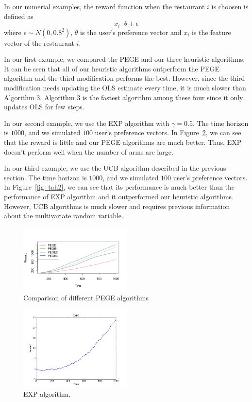 \documentclass{article}
\theoremstyle{plain}
\theoremstyle{definition}
\begin{document}
In our numerial examples, the reward function when the restaurant
$i$ is choosen is defined as 
\[
x_{i}\cdot\theta+\epsilon
\]
where $\epsilon\sim N\left(0,0.8^{2}\right)$, $\theta$ is the user's
preference vector and $x_{i}$ is the feature vector of the restaurant
$i$.

In our first example, we compared the PEGE and our three heuristic algorithms. It can be seen that all of our heuristic algorithms outperform the PEGE algorithm and the third modification performs the best. However, since the third modification needs updating the OLS estimate every time, it is much slower than Algorithm 3. Algorithm 3 is the fastest algorithm among these four since it only updates OLS for few steps.


In our second example, we use the EXP algorithm with $\gamma=0.5$.
The time horizon is $1000$, and we simulated $100$ user's preference
vectors. In Figure~\ref{fig: tahi}, we can see that the reward is little and our PEGE algorithms are much better. Thus, EXP doesn't perform well when the number of arms are large.

In our third example, we use the UCB algorithm described in the previous
section. The time horizon is $1000$, and we simulated $100$ user's
preference vectors.  In Figure~\ref{fig: tah2}, we can see that its performance is much better than the performance of EXP algorithm and it outperformed our heuristic algorithms. However, UCB algorithms is much slower and requires previous information about the multivariate random variable.

\begin{figure}[htb]
{
\centering
\includegraphics[width=0.50\textwidth,]{algo_compare}
\caption{Comparison of different PEGE algorithms \label{fig: tah0}}
}
\end{figure}




\begin{figure}[htb]
{
\centering
\includegraphics[width=0.50\textwidth]{plot11}
\caption{EXP algorithm. \label{fig: tahi}}
}
\end{figure}
\end{document}
